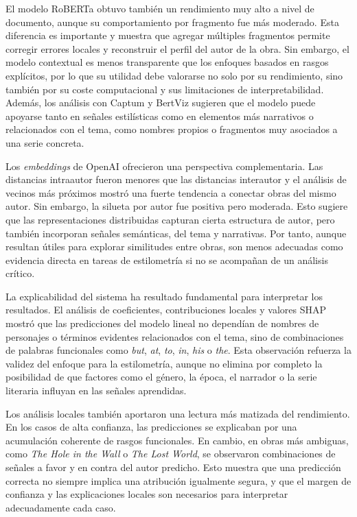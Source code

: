 \documentclass[IB]{TFUOC}%
\begin{document}
El modelo RoBERTa obtuvo también un rendimiento muy alto a nivel de documento, aunque su comportamiento por fragmento fue más moderado. Esta diferencia es importante y muestra que agregar múltiples fragmentos permite corregir errores locales y reconstruir el perfil del autor de la obra. Sin embargo, el modelo contextual es menos transparente que los enfoques basados en rasgos explícitos, por lo que su utilidad debe valorarse no solo por su rendimiento, sino también por su coste computacional y sus limitaciones de interpretabilidad. Además, los análisis con Captum y BertViz sugieren que el modelo puede apoyarse tanto en señales estilísticas como en elementos más narrativos o relacionados con el tema, como nombres propios o fragmentos muy asociados a una serie concreta.

Los \textit{embeddings} de OpenAI ofrecieron una perspectiva complementaria. Las distancias intraautor fueron menores que las distancias interautor y el análisis de vecinos más próximos mostró una fuerte tendencia a conectar obras del mismo autor. Sin embargo, la silueta por autor fue positiva pero moderada. Esto sugiere que las representaciones distribuidas capturan cierta estructura de autor, pero también incorporan señales semánticas, del tema y narrativas. Por tanto, aunque resultan útiles para explorar similitudes entre obras, son menos adecuadas como evidencia directa en tareas de estilometría si no se acompañan de un análisis crítico.

La explicabilidad del sistema ha resultado fundamental para interpretar los resultados. El análisis de coeficientes, contribuciones locales y valores SHAP mostró que las predicciones del modelo lineal no dependían de nombres de personajes o términos evidentes relacionados con el tema, sino de combinaciones de palabras funcionales como \textit{but}, \textit{at}, \textit{to}, \textit{in}, \textit{his} o \textit{the}. Esta observación refuerza la validez del enfoque para la estilometría, aunque no elimina por completo la posibilidad de que factores como el género, la época, el narrador o la serie literaria influyan en las señales aprendidas.

Los análisis locales también aportaron una lectura más matizada del rendimiento. En los casos de alta confianza, las predicciones se explicaban por una acumulación coherente de rasgos funcionales. En cambio, en obras más ambiguas, como \textit{The Hole in the Wall} o \textit{The Lost World}, se observaron combinaciones de señales a favor y en contra del autor predicho. Esto muestra que una predicción correcta no siempre implica una atribución igualmente segura, y que el margen de confianza y las explicaciones locales son necesarios para interpretar adecuadamente cada caso.
\end{document}
